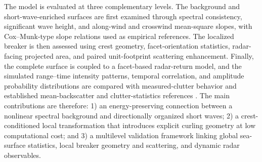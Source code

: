 The model is evaluated at three complementary levels. The background and short-wave-enriched surfaces are first examined through spectral consistency, significant wave height, and along-wind and crosswind mean-square slopes, with Cox--Munk-type slope relations used as empirical references. The localized breaker is then assessed using crest geometry, facet-orientation statistics, radar-facing projected area, and paired unit-footprint scattering enhancement. Finally, the complete surface is coupled to a facet-based radar-return model, and the simulated range--time intensity patterns, temporal correlation, and amplitude probability distributions are compared with measured-clutter behavior and established mean-backscatter and clutter-statistics references \cite{plant2003return,wentz1984sass,hersbach2007cmod5,carretero2010statistical,fiche2015xband,bocquet2022lga}. The main contributions are therefore: 1) an energy-preserving connection between a nonlinear spectral background and directionally organized short waves; 2) a crest-conditioned local transformation that introduces explicit curling geometry at low computational cost; and 3) a multilevel validation framework linking global sea-surface statistics, local breaker geometry and scattering, and dynamic radar observables.

